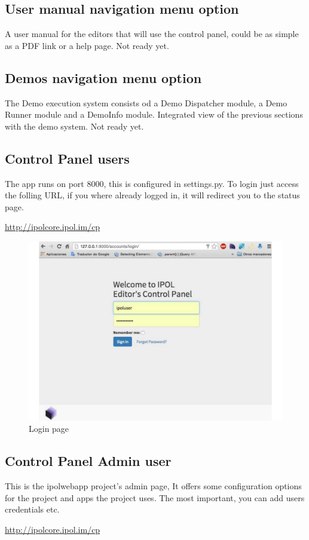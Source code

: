 \subsection{User manual navigation menu option}
A user manual for the editors that will use the control panel, could be as simple as a PDF link or a help page.
Not ready yet.

\subsection{Demos navigation menu option}
The Demo execution system consists od a Demo Dispatcher module, a Demo Runner module and a DemoInfo module.
Integrated view of the previous sections with the demo system.
Not ready yet.

\subsection{Control Panel users}
The app runs on port 8000, this is configured in settings.py.
To login just access the folling URL, if you where already logged in, it will redirect you to the status page.

\url{http://ipolcore.ipol.im/cp}

\begin{figure}[!ht]
\centering
\includegraphics[width=0.5\columnwidth]{images/login}
\caption{Login page} 
\label{fi:login_page}
\end{figure}

\subsection{Control Panel Admin user}
This is the ipolwebapp project's admin page, 
It offers some configuration options for the project and apps the project uses. The most important, you can add users credentials etc.

\url{http://ipolcore.ipol.im/cp}



